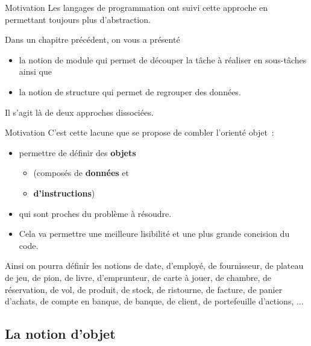 \begin{frame}{Motivation}
	Les langages de programmation ont suivi cette approche en permettant
	toujours plus d’abstraction. 
	
	Dans un chapitre précédent, on vous a	présenté 
	\begin{itemize}
		\item
		la notion de module qui permet de découper la tâche à réaliser
		en sous-tâches ainsi que 
		\item
		la notion de structure qui permet de regrouper des données.
	\end{itemize}
	
	Il s'agit là de deux approches	dissociées. 
\end{frame}

\begin{frame}{Motivation}
	C'est cette lacune que se propose de combler
	l'orienté objet~: 
	\begin{itemize}
		\item
		permettre de définir des \textbf{objets} 
		\begin{itemize}
			\item
			(composés de \textbf{données} et
			\item
			\textbf{d'instructions}) 
		\end{itemize}
		\item
		qui sont proches du problème
		à résoudre. 
		\item
		Cela va permettre une meilleure lisibilité et une plus
		grande concision du code. 
	
	\end{itemize}
	
	\bigskip
	
	Ainsi on pourra définir les notions de date,
	d'employé, de fournisseur, de plateau de jeu, de pion,
	de livre, d'emprunteur, de carte à jouer, de chambre,
	de réservation, de vol, de produit, de stock, de ristourne, de facture,
	de panier d'achats, de compte en banque, de banque, de
	client, de portefeuille d'actions, ...
\end{frame}

\subsection{La notion d'objet}

